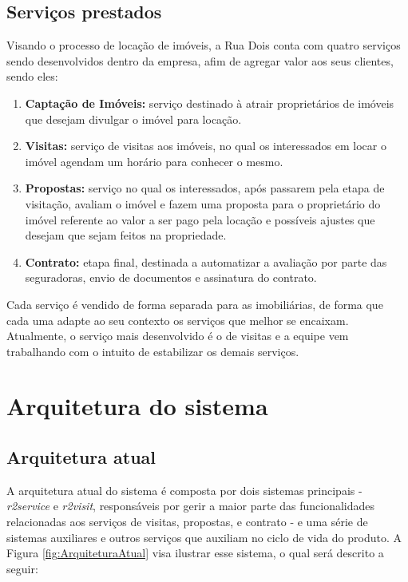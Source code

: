 
\subsection{Serviços prestados}

Visando o processo de locação de imóveis, a Rua Dois conta com quatro serviços
sendo desenvolvidos dentro da empresa, afim de agregar valor aos seus clientes,
sendo eles:

  \begin{enumerate}
    \item \textbf{Captação de Imóveis:} serviço destinado à atrair proprietários de
      imóveis que desejam divulgar o imóvel para locação.
    \item \textbf{Visitas:} serviço de visitas aos imóveis, no qual os interessados em
      locar o imóvel agendam um horário para conhecer o mesmo.
    \item \textbf{Propostas:} serviço no qual os interessados, após passarem pela etapa
      de visitação, avaliam o imóvel e fazem uma proposta para o proprietário do
      imóvel referente ao valor a ser pago pela locação e possíveis ajustes que
      desejam que sejam feitos na propriedade.
    \item \textbf{Contrato:} etapa final, destinada a automatizar a avaliação por parte
      das seguradoras, envio de documentos e assinatura do contrato.
  \end{enumerate}

Cada serviço é vendido de forma separada para as imobiliárias, de forma que cada uma
adapte ao seu contexto os serviços que melhor se encaixam. Atualmente, o serviço
mais desenvolvido é o de visitas e a equipe vem trabalhando com o intuito de
estabilizar os demais serviços.

\section{Arquitetura do sistema}

\subsection{Arquitetura atual}

A arquitetura atual do sistema é composta por dois sistemas principais -
\textit{r2service} e \textit{r2visit}, responsáveis por gerir a maior parte
das funcionalidades relacionadas aos serviços de visitas, propostas, e contrato -
e uma série de sistemas auxiliares e outros serviços que auxiliam no ciclo de
vida do produto. A Figura \ref{fig:ArquiteturaAtual} visa ilustrar esse sistema,
o qual será descrito a seguir:

